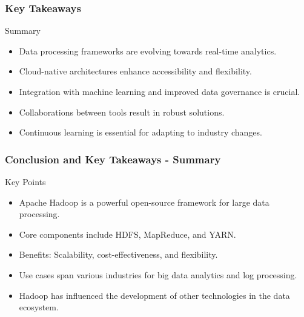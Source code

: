 \documentclass[aspectratio=169]{beamer}
\begin{document}
\begin{frame}[fragile]
    \frametitle{Key Takeaways}
    \begin{block}{Summary}
        \begin{itemize}
            \item Data processing frameworks are evolving towards real-time analytics.
            \item Cloud-native architectures enhance accessibility and flexibility.
            \item Integration with machine learning and improved data governance is crucial.
            \item Collaborations between tools result in robust solutions.
            \item Continuous learning is essential for adapting to industry changes.
        \end{itemize}
    \end{block}
\end{frame}

\begin{frame}[fragile]
    \frametitle{Conclusion and Key Takeaways - Summary}
    \begin{block}{Key Points}
        \begin{itemize}
            \item Apache Hadoop is a powerful open-source framework for large data processing.
            \item Core components include HDFS, MapReduce, and YARN.
            \item Benefits: Scalability, cost-effectiveness, and flexibility.
            \item Use cases span various industries for big data analytics and log processing.
            \item Hadoop has influenced the development of other technologies in the data ecosystem.
        \end{itemize}
    \end{block}
\end{frame}
\end{document}
